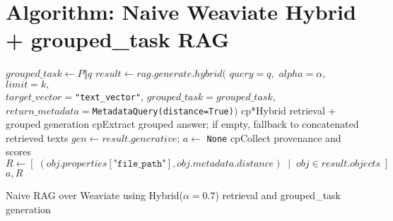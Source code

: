 \section{Algorithm: Naive Weaviate Hybrid + grouped\_task RAG}\label{alg:naive-weaviate-hybrid}
\begin{algorithm}[H]
  \DontPrintSemicolon
  \BlankLine
  $grouped\_task \leftarrow P \Vert q$ 
  $result \leftarrow rag.generate.hybrid($
    $query{=}q,$ $alpha{=}\alpha,$ $limit{=}k,$\\
    $target\_vector{=}$\texttt{"text\_vector"}, $grouped\_task{=}grouped\_task,$\\
    $return\_metadata{=}$\texttt{MetadataQuery(distance=True)}$)$
  	cp*{Hybrid retrieval + grouped generation}
  \BlankLine
  	cp{Extract grouped answer; if empty, fallback to concatenated retrieved texts}
  $gen \leftarrow result.generative$; $a \leftarrow$ \texttt{None}\;
  \BlankLine
  	cp{Collect provenance and scores}
  $R \leftarrow [\; (obj.properties[\texttt{"file\_path"}], obj.metadata.distance) \;\mid\; obj \in result.objects\; ]$\;
  \BlankLine
  \Return $a, R$\;
  \caption{Naive RAG over Weaviate using Hybrid($\alpha{=}0.7$) retrieval and grouped\_task generation}
\end{algorithm}